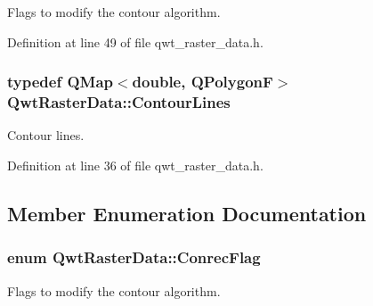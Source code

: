 Flags to modify the contour algorithm. 



Definition at line 49 of file qwt\-\_\-raster\-\_\-data.\-h.

\hypertarget{class_qwt_raster_data_adc6679160a229992f0870a2b784985f3}{
\subsubsection[{Contour\-Lines}]{\setlength{\rightskip}{0pt plus 5cm}typedef Q\-Map$<${\bf double}, Q\-Polygon\-F$>$ {\bf Qwt\-Raster\-Data\-::\-Contour\-Lines}}}\label{class_qwt_raster_data_adc6679160a229992f0870a2b784985f3}


Contour lines. 



Definition at line 36 of file qwt\-\_\-raster\-\_\-data.\-h.



\subsection{Member Enumeration Documentation}
\hypertarget{class_qwt_raster_data_ac0053b66315fde6f0a9a69c40d7c5dcc}{
\subsubsection[{Conrec\-Flag}]{\setlength{\rightskip}{0pt plus 5cm}enum {\bf Qwt\-Raster\-Data\-::\-Conrec\-Flag}}}\label{class_qwt_raster_data_ac0053b66315fde6f0a9a69c40d7c5dcc}


Flags to modify the contour algorithm. 

